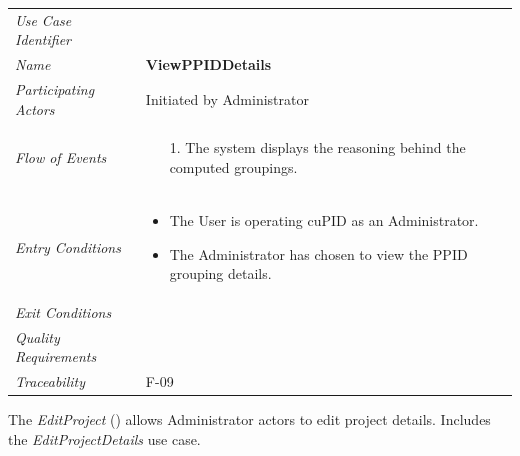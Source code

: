 \documentclass[12pt,letterpaper]{article}
\begin{document}
\begin{center}
	\begin{tabu} to 
		\toprule
		Use Case Identifier &  \\
		Name & {\bf ViewPPIDDetails} \\
		Participating Actors & Initiated by Administrator \\
		Flow of Events & 
		\begin{minipage}[t]{\linewidth}
		    \begin{enumerate}
		        \item[1.] The system displays the reasoning behind the computed groupings.
			\end{enumerate}
	    \end{minipage} \\

		Entry Conditions &
		\begin{minipage}[t]{\linewidth}
			\begin{itemize}
			    \item The User is operating cuPID as an Administrator.
			    \item The Administrator has chosen to view the PPID grouping details.
	        \end{itemize}
	    \end{minipage} \\

		Exit Conditions & \\

		Quality Requirements & \\

		Traceability & F-09 \\
		\toprule
	\end{tabu}
\end{center}

\newpage{}

\vspace{1em}
The {\it EditProject} () allows Administrator actors to edit project details. Includes the {\it EditProjectDetails} use case.
\end{document}
